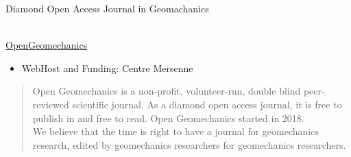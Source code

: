\documentclass[10pt,compress,serif,aspectratio=169]{beamer}
\begin{document}
\begin{frame}[t]{Diamond Open Access Journal in Geomachanics}

  \\
  {\Large \href{https://opengeomechanics.centre-mersenne.org/}{OpenGeomechanics}}

  \vfill
  \begin{itemize}
  \item WebHost and Funding: Centre Mersenne
  \end{itemize}

  \begin{quote}
    Open Geomechanics is a non-profit, volunteer-run, double blind
 peer-reviewed scientific journal. As a diamond open access journal,
 it is free to publish in and free to read. Open Geomechanics started
 in 2018.\\

 We believe that the time is right to have a journal for geomechanics
 research, edited by geomechanics researchers for geomechanics
 researchers.
\end{quote}
\end{frame}

\end{document}
